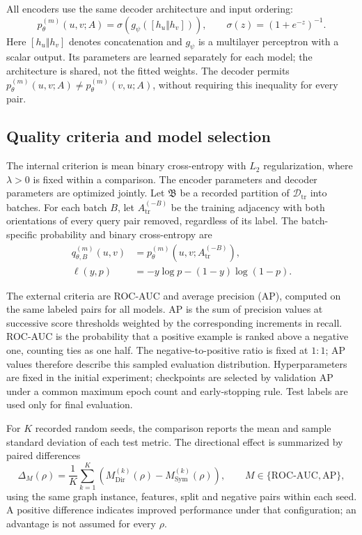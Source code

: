 \documentclass{article}
\begin{document}
All encoders use the same decoder architecture and input ordering:
\begin{equation}
p_\theta^{(m)}(u,v;A)=\sigma\!\left(g_\psi([h_u\Vert h_v])\right),
\qquad \sigma(z)=(1+e^{-z})^{-1}.
\end{equation}
Here $[h_u\Vert h_v]$ denotes concatenation and $g_\psi$ is a multilayer perceptron with a scalar output.
Its parameters are learned separately for each model; the architecture is shared, not the fitted weights.
The decoder permits $p_\theta^{(m)}(u,v;A)\ne p_\theta^{(m)}(v,u;A)$, without requiring this inequality for every pair.

\subsection{Quality criteria and model selection}
The internal criterion is mean binary cross-entropy with $L_2$ regularization, where $\lambda>0$ is fixed within a comparison.
The encoder parameters and decoder parameters are optimized jointly.
Let $\mathfrak B$ be a recorded partition of $\mathcal D_{\mathrm{tr}}$ into batches.
For each batch $B$, let $A_{\mathrm{tr}}^{(-B)}$ be the training adjacency with both orientations of every query pair removed, regardless of its label.
The batch-specific probability and binary cross-entropy are
\begin{equation}
\begin{split}
q_{\theta,B}^{(m)}(u,v)&=p_\theta^{(m)}(u,v;A_{\mathrm{tr}}^{(-B)}),\\
\ell(y,p)&=-y\log p-(1-y)\log(1-p).
\end{split}
\end{equation}

The external criteria are ROC-AUC and average precision (AP), computed on the same labeled pairs for all models.
AP is the sum of precision values at successive score thresholds weighted by the corresponding increments in recall.
ROC-AUC is the probability that a positive example is ranked above a negative one, counting ties as one half.
The negative-to-positive ratio is fixed at $1:1$; AP values therefore describe this sampled evaluation distribution.
Hyperparameters are fixed in the initial experiment; checkpoints are selected by validation AP under a common maximum epoch count and early-stopping rule.
Test labels are used only for final evaluation.

For $K$ recorded random seeds, the comparison reports the mean and sample standard deviation of each test metric.
The directional effect is summarized by paired differences
\begin{equation}
\Delta_M(\rho)=\frac1K\sum_{k=1}^{K}
\left(M^{(k)}_{\mathrm{Dir}}(\rho)-M^{(k)}_{\mathrm{Sym}}(\rho)\right),
\qquad M\in\{\mathrm{ROC\mbox{-}AUC},\mathrm{AP}\},
\end{equation}
using the same graph instance, features, split and negative pairs within each seed.
A positive difference indicates improved performance under that configuration; an advantage is not assumed for every $\rho$.
\end{document}

